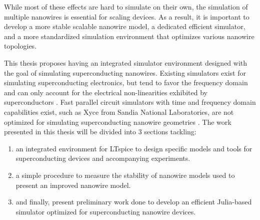 While most of these effects are hard to simulate on their own, the simulation of multiple nanowires
is essential for scaling devices. As a result, it is important to develop 
a more stable scalable nanowire model, a dedicated efficient simulator, and a more standardized 
simulation environment that optimizes various nanowire topologies.

This thesis proposes having an integrated simulator environment designed with the goal of simulating
superconducting nanowires. Existing simulators exist for simulating
superconducting electronics, but tend to favor the frequency domain and can  
only account for 
the electrical non-linearities exhibited by superconductors \cite{josephsoncircsjl, wrspice}. 
Fast parallel circuit simulators with time and frequency domain capabilities
exist, such as Xyce from Sandia National Laboratories, are not optimized
for simulating superconducting nanowire geometries \cite{xyce_reference}.
The work presented in this thesis will be divided into 3 sections tackling: 
\begin{enumerate}
    \item an integrated environment for LTspice to design specific models and tools for superconducting 
    devices and accompanying experiments.
    \item a simple procedure to measure the stability of nanowire models used to 
    present an improved nanowire model.
    \item and finally, present preliminary work done to develop an efficient Julia-based simulator
    optimized for superconducting nanowire devices.
\end{enumerate}




